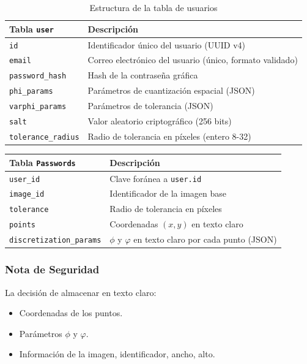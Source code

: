 \begin{table}[ht]
	\centering
	\caption{Estructura de la tabla de usuarios}
	\label{tab:bd-esquema}
	\begin{tabularx}{\textwidth}{lX}
		\toprule
		\textbf{Tabla \texttt{user}} & \textbf{Descripción} \\
		\midrule
		\texttt{id} & Identificador único del usuario (UUID v4) \\
		\texttt{email} & Correo electrónico del usuario (único, formato validado) \\
		\texttt{password\_hash} & Hash de la contraseña gráfica \\
		\texttt{phi\_params} & Parámetros de cuantización espacial (JSON) \\
		\texttt{varphi\_params} & Parámetros de tolerancia (JSON) \\
		\texttt{salt} & Valor aleatorio criptográfico (256 bits) \\
		\texttt{tolerance\_radius} & Radio de tolerancia en píxeles (entero 8-32) \\
	
		\bottomrule
	\end{tabularx}
\end{table}


\begin{table}[ht]
	\centering
	\begin{tabularx}{\textwidth}{lX}
		\toprule
		\textbf{Tabla \texttt{Passwords}} & \textbf{Descripción} \\
		\midrule
		\texttt{user\_id} & Clave foránea a \texttt{user.id} \\
		\texttt{image\_id} & Identificador de la imagen base \\
		\texttt{tolerance} & Radio de tolerancia en píxeles \\
		\texttt{points} & Coordenadas $(x,y)$ en texto claro \\
		\texttt{discretization\_params} & $\phi$ y $\varphi$ en texto claro por cada punto (JSON) \\
		\bottomrule
	\end{tabularx}
\end{table}

\subsubsection{Nota de Seguridad}
La decisión de almacenar en texto claro:
\begin{itemize}
	\item Coordenadas de los puntos.
	\item Parámetros $\phi$ y $\varphi$.
	\item Informaci\'on de la imagen, identificador, ancho, alto.
\end{itemize}

